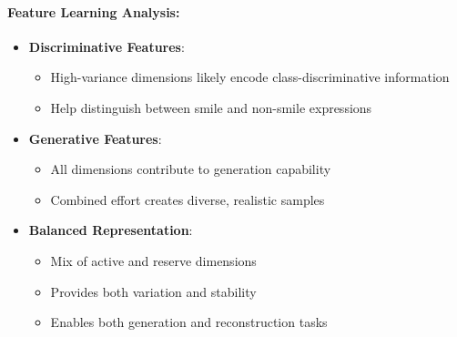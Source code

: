\documentclass[conference]{IEEEtran}
\begin{document}
\paragraph{Feature Learning Analysis:}
\begin{itemize}
    \item \textbf{Discriminative Features}: 
    \begin{itemize}
        \item High-variance dimensions likely encode class-discriminative information
        \item Help distinguish between smile and non-smile expressions
    \end{itemize}
    
    \item \textbf{Generative Features}:
    \begin{itemize}
        \item All dimensions contribute to generation capability
        \item Combined effort creates diverse, realistic samples
    \end{itemize}
    
    \item \textbf{Balanced Representation}:
    \begin{itemize}
        \item Mix of active and reserve dimensions
        \item Provides both variation and stability
        \item Enables both generation and reconstruction tasks
    \end{itemize}
\end{itemize}
\end{document}
